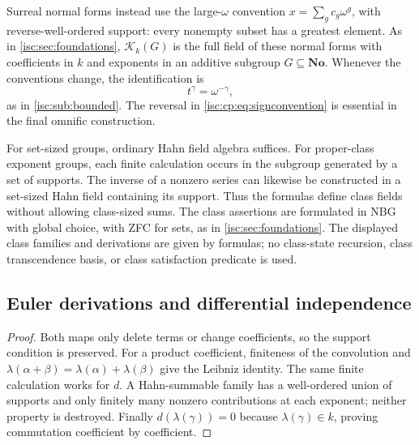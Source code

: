 \documentclass[11pt,letterpaper]{article}
\newtheorem{lemma}[theorem]{Lemma}
\theoremstyle{definition}
\newtheorem{definition}[theorem]{Definition}
\theoremstyle{remark}
\newcommand{\No}{\mathbf{No}}
\newcommand{\Z}{\mathbb Z}
\newcommand{\K}[2]{\mathcal K_{#1}(#2)}
\numberwithin{equation}{section}
\begin{document}
Surreal normal forms instead use the large-$\omega$ convention
$x=\sum_g c_g\omega^g$, with reverse-well-ordered support: every nonempty
subset has a greatest element. As in \cref{isc:sec:foundations}, $\K{k}{G}$
is the full field of these normal forms with coefficients in $k$ and
exponents in an additive subgroup $G\subseteq\No$. Whenever the conventions
change, the identification is
\begin{equation}\label{isc:cp:eq:signconvention}
 t^\gamma=\omega^{-\gamma},
\end{equation}
as in \cref{isc:sub:bounded}. The reversal in
\eqref{isc:cp:eq:signconvention} is essential in the final omnific
construction.

For set-sized groups, ordinary Hahn field algebra suffices. For
proper-class exponent groups, each finite calculation occurs in the
subgroup generated by a set of supports. The inverse of a nonzero series
can likewise be constructed in a set-sized Hahn field containing its
support. Thus the formulas define class fields without allowing class-sized
sums. The class assertions are formulated in NBG with global choice, with
ZFC for sets, as in \cref{isc:sec:foundations}. The displayed class families
and derivations are given by formulas; no class-state recursion, class
transcendence basis, or class satisfaction predicate is used.

\subsection{Euler derivations and differential independence}


\begin{proof}
Both maps only delete terms or change coefficients, so the support
condition is preserved. For a product coefficient, finiteness of the
convolution and $\lambda(\alpha+\beta)=\lambda(\alpha)+\lambda(\beta)$ give
the Leibniz identity. The same finite calculation works for $d$. A
Hahn-summable family has a well-ordered union of supports and only finitely
many nonzero contributions at each exponent; neither property is destroyed.
Finally $d(\lambda(\gamma))=0$ because $\lambda(\gamma)\in k$, proving
commutation coefficient by coefficient.
\end{proof}
\end{document}
